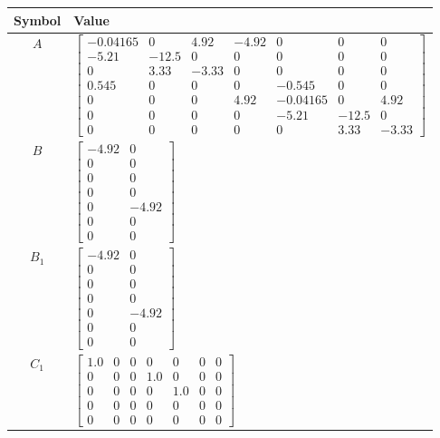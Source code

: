 \begin{tabular}{cl}
\hline
  Symbol  & Value                                                                                                                                                                                                                                                                                                  \\
\hline
   $A$    & $\left[\begin{matrix}-0.04165 & 0 & 4.92 & -4.92 & 0 & 0 & 0\\-5.21 & -12.5 & 0 & 0 & 0 & 0 & 0\\0 & 3.33 & -3.33 & 0 & 0 & 0 & 0\\0.545 & 0 & 0 & 0 & -0.545 & 0 & 0\\0 & 0 & 0 & 4.92 & -0.04165 & 0 & 4.92\\0 & 0 & 0 & 0 & -5.21 & -12.5 & 0\\0 & 0 & 0 & 0 & 0 & 3.33 & -3.33\end{matrix}\right]$ \\
   $B$    & $\left[\begin{matrix}-4.92 & 0\\0 & 0\\0 & 0\\0 & 0\\0 & -4.92\\0 & 0\\0 & 0\end{matrix}\right]$                                                                                                                                                                                                       \\
 $B_{1}$  & $\left[\begin{matrix}-4.92 & 0\\0 & 0\\0 & 0\\0 & 0\\0 & -4.92\\0 & 0\\0 & 0\end{matrix}\right]$                                                                                                                                                                                                       \\
 $C_{1}$  & $\left[\begin{matrix}1.0 & 0 & 0 & 0 & 0 & 0 & 0\\0 & 0 & 0 & 1.0 & 0 & 0 & 0\\0 & 0 & 0 & 0 & 1.0 & 0 & 0\\0 & 0 & 0 & 0 & 0 & 0 & 0\\0 & 0 & 0 & 0 & 0 & 0 & 0\end{matrix}\right]$                                                                                                                   \\

\end{tabular}
